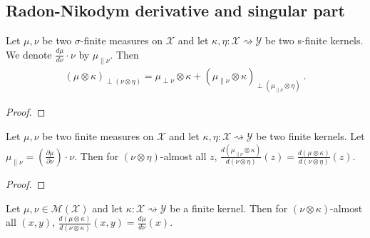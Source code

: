 \subsection{Radon-Nikodym derivative and singular part}

\begin{lemma}
  \label{lem:singularPart_compProd}
  Let $\mu, \nu$ be two $\sigma$-finite measures on $\mathcal X$ and let $\kappa, \eta : \mathcal X \rightsquigarrow \mathcal Y$ be two s-finite kernels.
  We denote $\frac{d\mu}{d\nu}\cdot \nu$ by $\mu_{\parallel \nu}$.
  Then
  \begin{align*}
  (\mu \otimes \kappa)_{\perp (\nu \otimes \eta)} = \mu_{\perp \nu} \otimes \kappa + (\mu_{\parallel \nu} \otimes \kappa)_{\perp (\mu_{\parallel \nu} \otimes \eta)}
  \: .
  \end{align*}
\end{lemma}

\begin{proof}%
\uses{}

\end{proof}


\begin{lemma}
  \label{lem:rnDeriv_eq_ac_left}
  \leanok
  \uses{}
  Let $\mu, \nu$ be two finite measures on $\mathcal X$ and let $\kappa, \eta : \mathcal X \rightsquigarrow \mathcal Y$ be two finite kernels.
  Let $\mu_{\parallel \nu} = \left(\frac{\partial \mu}{\partial \nu}\right) \cdot \nu$.
  Then for $(\nu \otimes \eta)$-almost all $z$, $\frac{d (\mu_{\parallel \nu} \otimes \kappa)}{d (\nu \otimes \eta)}(z) = \frac{d (\mu \otimes \kappa)}{d (\nu \otimes \eta)}(z)$.
\end{lemma}

\begin{proof} \leanok
{}
\end{proof}


\begin{lemma}
  \label{cor:rnDeriv_compProd_left}
  \leanok
  \uses{}
  Let $\mu, \nu \in \mathcal M(\mathcal X)$ and let $\kappa : \mathcal X \rightsquigarrow \mathcal Y$ be a finite kernel. Then for $(\nu \otimes \kappa)$-almost all $(x, y)$, $\frac{d (\mu \otimes \kappa)}{d (\nu \otimes \kappa)}(x,y) = \frac{d\mu}{d\nu}(x)$.
\end{lemma}

